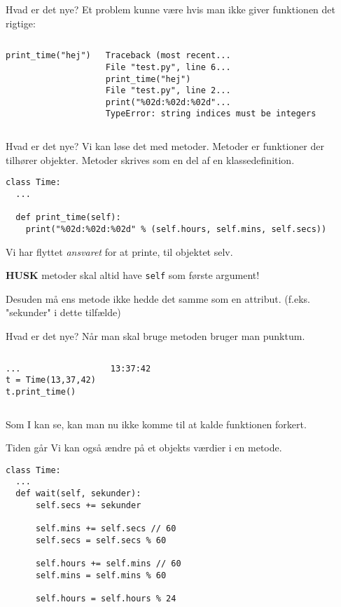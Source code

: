 \documentclass[main.tex]{subfiles}
\begin{document}
\begin{frame}[fragile]{Hvad er det nye?}
Et problem kunne være hvis man ikke giver funktionen det rigtige:
\begin{columns}
\begin{lstlisting}[style=python]
print_time("hej")
\end{lstlisting}
\pause
{}
\begin{lstlisting}[style=python]
Traceback (most recent...
File "test.py", line 6...
print_time("hej")
File "test.py", line 2...
print("%02d:%02d:%02d"...
TypeError: string indices must be integers
\end{lstlisting}
\end{columns}
\end{frame}

\begin{frame}[fragile]{Hvad er det nye?}
Vi kan løse det med metoder. Metoder er funktioner der tilhører objekter. Metoder skrives som en del af en klassedefinition.
\begin{lstlisting}[style=python]
class Time:
  ...

  def print_time(self):
    print("%02d:%02d:%02d" % (self.hours, self.mins, self.secs))
\end{lstlisting}
\pause
Vi har flyttet \textit{ansvaret} for at printe, til objektet selv.

\textbf{HUSK} metoder skal altid have \texttt{self} som første argument!

Desuden må ens metode ikke hedde det samme som en attribut. (f.eks. "sekunder" i dette tilfælde)
\end{frame}

\begin{frame}[fragile]{Hvad er det nye?}
Når man skal bruge metoden bruger man punktum.
\begin{columns}
\begin{lstlisting}[style=python]
...
t = Time(13,37,42)
t.print_time()
\end{lstlisting}
\pause
{}
\begin{lstlisting}[style=python]
13:37:42
\end{lstlisting}
\end{columns}
\pause
Som I kan se, kan man nu ikke komme til at kalde funktionen forkert.
\end{frame}


\begin{frame}[fragile]{Tiden går}
Vi kan også ændre på et objekts værdier i en metode.
\begin{lstlisting}[style=python]
class Time:
  ...
  def wait(self, sekunder):
	  self.secs += sekunder
	  
	  self.mins += self.secs // 60
	  self.secs = self.secs % 60
	  
	  self.hours += self.mins // 60
	  self.mins = self.mins % 60
	  
	  self.hours = self.hours % 24
\end{lstlisting}
\end{frame}
\end{document}
